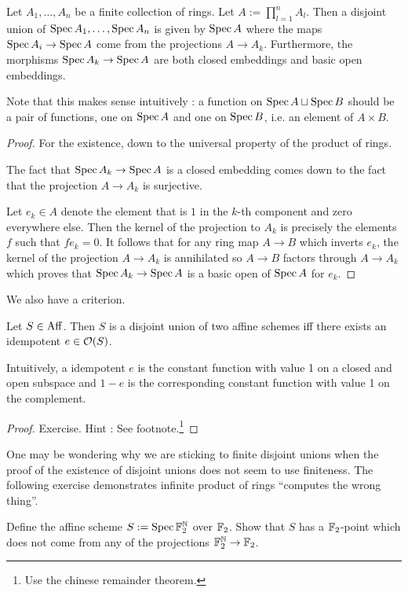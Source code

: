 \documentclass[./main.tex]{subfiles}
\begin{document}
\begin{prop}
  
  Let $A_1 , \dots , A_n$ be a finite collection of rings.
  Let $A := \prod_{l = 1}^n A_l$.
  Then a disjoint union of $\operatorname{Spec} A_1 , \dots , \operatorname{Spec} A_n$ is
  given by $\operatorname{Spec} A$
  where the maps $\operatorname{Spec} A_i \to \operatorname{Spec} A$
  come from the projections $A \to A_k$.
  Furthermore, the morphisms $\operatorname{Spec} A_k \to \operatorname{Spec} A$
  are both closed embeddings and basic open embeddings.

\end{prop}
Note that this makes sense intuitively : 
a function on $\operatorname{Spec} A \sqcup \operatorname{Spec} B$ should be
a pair of functions, one on $\operatorname{Spec} A$ and one on $\operatorname{Spec} B$,
i.e. an element of $A \times B$.
\begin{proof}
  For the existence, down to the universal property of the product of rings.

  The fact that $\operatorname{Spec} A_k \to \operatorname{Spec} A$
  is a closed embedding comes down to
  the fact that the projection $A \to A_k$ is surjective.

  Let $e_k \in A$ denote the
  element that is $1$ in the $k$-th component and zero everywhere else.
  Then the kernel of the projection to $A_k$ is precisely
  the elements $f$ such that $f e_k = 0$.
  It follows that for any ring map $A \to B$ which inverts $e_k$,
  the kernel of the projection $A \to A_k$ is annihilated
  so $A \to B$ factors through $A \to A_k$
  which proves that $\operatorname{Spec} A_k \to \operatorname{Spec} A$ is a basic open 
  of $\operatorname{Spec} A$ for $e_k$.
\end{proof}

We also have a criterion.

\begin{prop}
  
  Let $S \in \mathrm{Aff}$.
  Then $S$ is a disjoint union of two affine schemes
  iff there exists an idempotent $e \in \mathcal{O}(S)$.
\end{prop}
Intuitively, a idempotent $e$ is
the constant function with value 1 on a closed and open subspace
and $1 - e$ is the corresponding constant function with value 1
on the complement.
\begin{proof}
  Exercise. Hint : See footnote.\footnote{
    Use the chinese remainder theorem.
  }
\end{proof}

One may be wondering why we are sticking to finite disjoint unions
when the proof of the existence of disjoint unions
does not seem to use finiteness.
The following exercise demonstrates infinite product of rings
``computes the wrong thing''.

\begin{ex}
  Define the affine scheme $S := \operatorname{Spec} \mathbb{F}_2^{\mathbb{N}}$ over $\mathbb{F}_2$.
  Show that $S$ has a $\mathbb{F}_2$-point which does not
  come from any of the projections $\mathbb{F}_2^{\mathbb{N}} \to \mathbb{F}_2$.
\end{ex}
\end{document}
